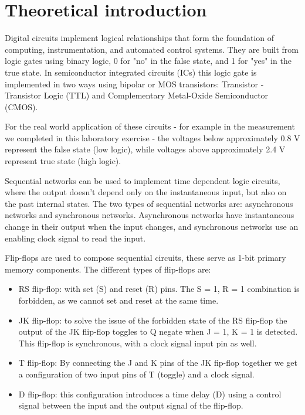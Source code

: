 \documentclass[12pt]{article}
\begin{document}
\section{Theoretical introduction}
Digital circuits implement logical relationships that form the foundation of computing, 
instrumentation, and automated control systems. They are built from logic gates using binary 
logic, 0 for "no" in the false state, and 1 for "yes" in the true state. In semiconductor integrated
circuits (ICs) this logic gate is implemented in two ways using bipolar or MOS transistors: 
Transistor - Transistor Logic (TTL) and Complementary Metal-Oxide Semiconductor (CMOS).

For the real world application of these circuits - for example in the measurement we completed in 
this laboratory exercise - the voltages below approximately 0.8 V represent the false state (low logic), 
while voltages above approximately 2.4 V represent true state (high logic).

Sequential networks can be used to implement time dependent logic circuits, where the output doesn't depend 
only on the instantaneous input, but also on the past internal states. The two types of sequential networks are: 
asynchronous networks and synchronous networks. Asynchronous networks have instantaneous change in their output 
when the input changes, and synchronous networks use an enabling clock signal to read the input.

Flip-flops are used to compose sequential circuits, these serve as 1-bit primary memory components. The different 
types of flip-flops are:
\begin{itemize}
\item RS flip-flop: with set (S) and reset (R) pins. The S = 1, R = 1 combination is forbidden, as we cannot 
set and reset at the same time.
\item JK flip-flop: to solve the issue of the forbidden state of the RS flip-flop the output of the JK flip-flop 
toggles to Q negate when J = 1, K = 1 is detected. This flip-flop is synchronous, with a clock signal input 
pin as well.
\item T flip-flop: By connecting the J and K pins of the JK fip-flop together we get a configuration of two 
input pins of T (toggle) and a clock signal.
\item D flip-flop: this configuration introduces a time delay (D) using a control signal between the input 
and the output signal of the flip-flop.
\end{itemize}
\end{document}
